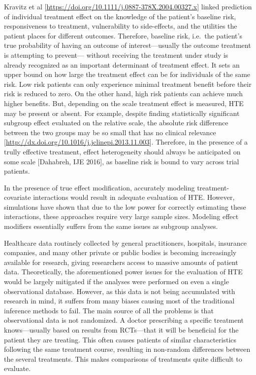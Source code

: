 \documentclass[
]{book}
\begin{document}
Kravitz et al {[}\url{https://doi.org/10.1111/j.0887-378X.2004.00327.x}{]} linked
prediction of individual treatment effect on the knowledge of the patient's
baseline risk, responsiveness to treatment, vulnerability to side-effects, and
the utilities the patient places for different outcomes. Therefore, baseline
risk, i.e.~the patient's true probability of having an outcome of
interest---usually the outcome treatment is attempting to prevent--- without
receiving the treatment under study is already recognized as an important
determinant of treatment effect. It sets an upper bound on how large the
treatment effect can be for individuals of the same risk. Low risk patients can
only experience minimal treatment benefit before their risk is reduced to
zero. On the other hand, high risk patients can achieve much higher
benefits. But, depending on the scale treatment effect is measured, HTE may be
present or absent. For example, despite finding statistically significant
subgroup effect evaluated on the relative scale, the absolute risk difference
between the two groups may be so small that has no clinical relevance
{[}\url{http://dx.doi.org/10.1016/j.jclinepi.2013.11.003}{]}. Therefore, in the presence
of a trully effective treatment, effect heterogeneity should always be
anticipated on some scale {[}Dahabreh, IJE 2016{]}, as baseline risk is bound to
vary across trial patients.

In the presence of true effect modification, accurately modeling
treatment-covariate interactions would result in adequate evaluation of
HTE. However, simulations have shown that due to the low power for correctly
estimating these interactions, these approaches require very large sample
sizes. Modeling effect modifiers essentially suffers from the same issues as
subgroup analyses.

Healthcare data routinely collected by general practitioners, hospitals,
insurance companies, and many other private or public bodies is becoming
increasingly available for research, giving researchers access to massive
amounts of patient data. Theoretically, the aforementioned power issues for the
evaluation of HTE would be largely mitigated if the analyses were performed on
even a single observational database. However, as this data is not being
accumulated with research in mind, it suffers from many biases causing most of
the traditional inference methods to fail. The main source of all the problems
is that observational data is not randomized. A doctor prescribing a specific
treatment knows---usually based on results from RCTs---that it will be
beneficial for the patient they are treating. This often causes patients of
similar characteristics following the same treatment course, resulting in
non-random differences between the several treatments. This makes comparisons of
treatments quite difficult to evaluate.
\end{document}
